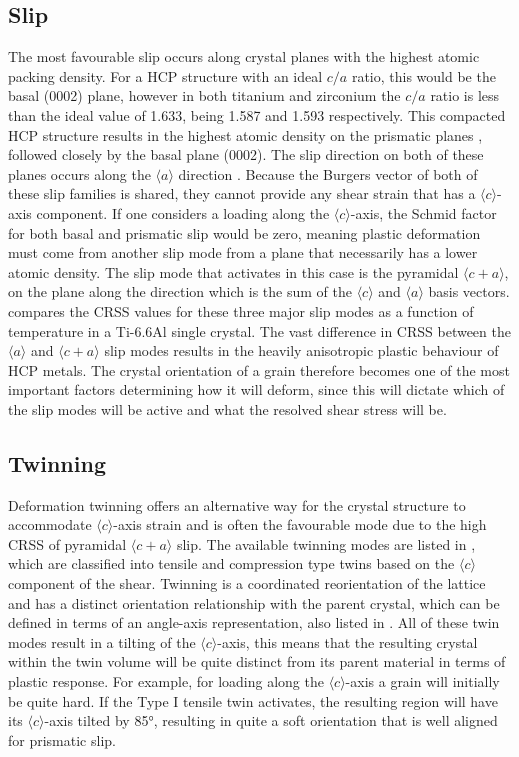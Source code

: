 \subsection{Slip}
The most favourable slip occurs along crystal planes with the highest atomic packing density.
For a HCP structure with an ideal $c/a$ ratio, this would be the basal \hkl(0002) plane, however in both titanium and zirconium the $c/a$ ratio is less than the ideal value of 1.633, being 1.587 and 1.593 respectively.
This compacted HCP structure results in the highest atomic density on the prismatic planes , followed closely by the basal plane \hkl(0002).
The slip direction on both of these planes occurs along the $\langle a \rangle$ direction .
Because the Burgers vector of both of these slip families is shared, they cannot provide any shear strain that has a $\langle c \rangle$-axis component.
If one considers a loading along the $\langle c \rangle$-axis, the Schmid factor for both basal and prismatic slip would be zero, meaning plastic deformation must come from another slip mode from a plane that necessarily has a lower atomic density.
The slip mode that activates in this case is the pyramidal $\langle c + a \rangle$, on the  plane along the  direction which is the sum of the $\langle c \rangle$ and $\langle a \rangle$ basis vectors.
 compares the CRSS values for these three major slip modes as a function of temperature in a Ti-6.6Al single crystal. 
The vast difference in CRSS between the $\langle a \rangle$ and $\langle c + a \rangle$ slip modes results in the heavily anisotropic plastic behaviour of HCP metals.
The crystal orientation of a grain therefore becomes one of the most important factors determining how it will deform, since this will dictate which of the slip modes will be active and what the resolved shear stress will be.



\subsection{Twinning}
Deformation twinning offers an alternative way for the crystal structure to accommodate $\langle c \rangle$-axis strain and is often the favourable mode due to the high CRSS of pyramidal $\langle c + a \rangle$ slip.
The available twinning modes are listed in , which are classified into tensile and compression type twins based on the $\langle c \rangle$ component of the shear.
Twinning is a coordinated reorientation of the lattice and has a distinct orientation relationship with the parent crystal, which can be defined in terms of an angle-axis representation, also listed in .
All of these twin modes result in a tilting of the $\langle c \rangle$-axis, this means that the resulting crystal within the twin volume will be quite distinct from its parent material in terms of plastic response.
For example, for loading along the $\langle c \rangle$-axis a grain will initially be quite hard. If the Type I tensile twin activates, the resulting region will have its $\langle c \rangle$-axis tilted by 85°, resulting in quite a soft orientation that is well aligned for prismatic slip.

